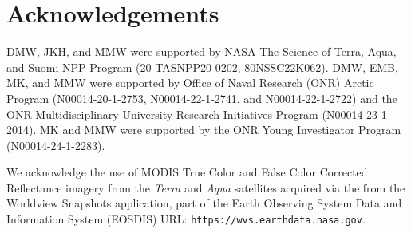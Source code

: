 \documentclass[review, jog]{igs}
\begin{document}
\section{Acknowledgements} 
DMW, JKH, and MMW were supported by NASA The Science of Terra, Aqua, and Suomi-NPP Program (20-TASNPP20-0202, 80NSSC22K062). DMW, EMB, MK, and MMW were supported by Office of Naval Research (ONR) Arctic Program (N00014-20-1-2753, N00014-22-1-2741, and N00014-22-1-2722) and the ONR Multidisciplinary University Research Initiatives Program (N00014-23-1-2014).
MK and MMW were supported by the ONR Young Investigator Program (N00014-24-1-2283).

We acknowledge the use of MODIS True Color and False Color Corrected Reflectance imagery from the \textit{Terra} and \textit{Aqua} satellites acquired via the from the Worldview Snapshots application, part of the Earth Observing System Data and Information System (EOSDIS) URL: {\texttt{https://wvs.earthdata.nasa.gov}}. 


\end{document}
